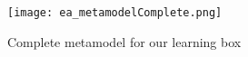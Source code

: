 \begin{enumerate}
\newpage


\begin{figure}[htbp]
	\centering
  \texttt{[image: ea\_metamodelComplete.png]}
\caption[Complete metamodel for our learning box.]{Complete metamodel for our learning box}
	\label{ea:metamodel_complete}
\end{figure}
\FloatBarrier


\end{enumerate}

